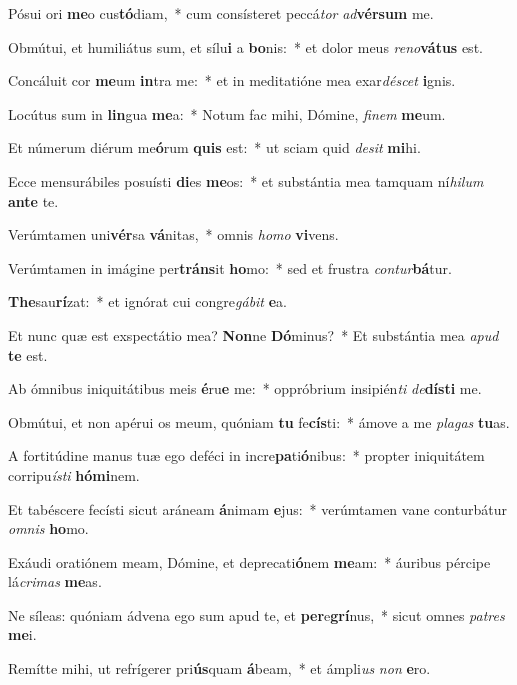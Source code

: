 \item Pósui ori \textbf{me}o cus\textbf{tó}diam,~* cum consísteret peccá\textit{tor} \textit{ad}\textbf{vér}\textbf{sum} me.
\item Obmútui, et humiliátus sum, et sílu\textbf{i} a \textbf{bo}nis:~* et dolor meus \textit{re}\textit{no}\textbf{vá}\textbf{tus} est.
\item Concáluit cor \textbf{me}um \textbf{in}tra me:~* et in meditatióne mea exar\textit{dé}\textit{scet} \textbf{i}gnis.
\item Locútus sum in \textbf{lin}gua \textbf{me}a:~* Notum fac mihi, Dómine, \textit{fi}\textit{nem} \textbf{me}um.
\item Et númerum diérum me\textbf{ó}rum \textbf{quis} est:~* ut sciam quid \textit{de}\textit{sit} \textbf{mi}hi.
\item Ecce mensurábiles posuísti \textbf{di}es \textbf{me}os:~* et substántia mea tamquam ní\textit{hi}\textit{lum} \textbf{an}\textbf{te} te.
\item Verúmtamen uni\textbf{vér}sa \textbf{vá}nitas,~* omnis \textit{ho}\textit{mo} \textbf{vi}vens.
\item Verúmtamen in imágine per\textbf{tráns}it \textbf{ho}mo:~* sed et frustra \textit{con}\textit{tur}\textbf{bá}tur.
\item \textbf{The}sau\textbf{rí}zat:~* et ignórat cui congre\textit{gá}\textit{bit} \textbf{e}a.
\item Et nunc quæ est exspectátio mea? \textbf{Non}ne \textbf{Dó}minus?~* Et substántia mea \textit{a}\textit{pud} \textbf{te} est.
\item Ab ómnibus iniquitátibus meis \textbf{é}ru\textbf{e} me:~* oppróbrium insipién\textit{ti} \textit{de}\textbf{dís}\textbf{ti} me.
\item Obmútui, et non apérui os meum, quóniam \textbf{tu} fe\textbf{cís}ti:~* ámove a me \textit{pla}\textit{gas} \textbf{tu}as.
\item A fortitúdine manus tuæ ego deféci in incre\textbf{pa}ti\textbf{ó}nibus:~* propter iniquitátem corripu\textit{ís}\textit{ti} \textbf{hó}\textbf{mi}nem.
\item Et tabéscere fecísti sicut aráneam \textbf{á}nimam \textbf{e}jus:~* verúmtamen vane conturbátur \textit{om}\textit{nis} \textbf{ho}mo.
\item Exáudi oratiónem meam, Dómine, et deprecati\textbf{ó}nem \textbf{me}am:~* áuribus pércipe lá\textit{cri}\textit{mas} \textbf{me}as.
\item Ne síleas: quóniam ádvena ego sum apud te, et \textbf{per}e\textbf{grí}nus,~* sicut omnes \textit{pa}\textit{tres} \textbf{me}i.
\item Remítte mihi, ut refrígerer pri\textbf{ús}quam \textbf{á}beam,~* et ámpli\textit{us} \textit{non} \textbf{e}ro.
